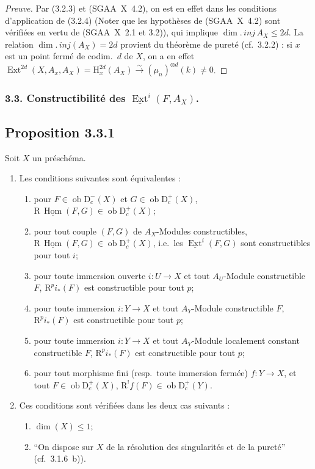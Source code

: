 \documentclass[11pt]{article}
\renewcommand{\H}{\mathrm{H}}
\DeclareMathOperator{\Hom}{Hom}
\DeclareMathOperator{\Ext}{Ext}
\newcommand{\R}{\mathrm{R}}
\newcommand{\D}{\mathrm{D}}
\newcommand{\ob}{\operatorname{ob}}
\providecommand{\Hom}{\operatorname{Hom}}
\providecommand{\ob}{\operatorname{ob}}
\providecommand{\R}{\mathrm R}
\providecommand{\Hom}{\operatorname{Hom}}
\begin{document}
\begin{proof}[Preuve]
Par (3.2.3) et (SGAA~X~4.2), on est en effet dans les conditions d'application de (3.2.4) (Noter que les hypothèses de (SGAA~X~4.2) sont vérifiées en vertu de (SGAA~X~2.1 et 3.2)), qui implique $\dim.\,inj\, A_X \leqslant 2d$. La relation $\dim.\,inj(A_X) = 2d$ provient du théorème de pureté (cf.~3.2.2) : si $x$ est un point fermé de codim.~$d$ de $X$, on a en effet $\Ext^{2d}(X, A_x, A_X) = \H^{2d}_x(A_X) \xrightarrow{\sim} (\mu_n)^{\otimes d}(k) \neq 0$.
\end{proof}

\subsubsection{3.3. Constructibilité des $\underline{\Ext}^i(F, A_X)$.}

\subsection*{Proposition 3.3.1}
Soit $X$ un préschéma.
\begin{enumerate}
\item[a)] Les conditions suivantes sont équivalentes :
\begin{enumerate}
\item[(i)] pour $F \in \ob \D_c^{-}(X)$ et $G \in \ob \D_c^{+}(X)$, $\R\,\underline{\Hom}(F,G) \in \ob \D_c^{+}(X)$;
\item[(i~bis)] pour tout couple $(F,G)$ de $A_X$-Modules constructibles, $\R\,\underline{\Hom}(F,G) \in \ob \D_c^{+}(X)$, i.e.~les $\underline{\Ext}^i(F,G)$ sont constructibles pour tout $i$;
\item[(ii)] pour toute immersion ouverte $i : U \to X$ et tout $A_U$-Module constructible $F$, $\R^p i_{*}(F)$ est constructible pour tout $p$;
\item[(ii~bis)] pour toute immersion $i : Y \to X$ et tout $A_Y$-Module constructible $F$, $\R^p i_{*}(F)$ est constructible pour tout $p$;
\item[(ii~ter)] pour toute immersion $i : Y \to X$ et tout $A_Y$-Module localement constant constructible $F$, $\R^p i_{*}(F)$ est constructible pour tout $p$;
\item[(iii)] pour tout morphisme fini (resp.~toute immersion fermée) $f : Y \to X$, et tout $F \in \ob \D_c^{+}(X)$, $\R^{!}f(F) \in \ob \D_c^{+}(Y)$.
\end{enumerate}
\item[b)] Ces conditions sont vérifiées dans les deux cas suivants :
\begin{enumerate}
\item[(i)] $\dim(X) \leqslant 1$;
\item[(ii)] ``On dispose sur $X$ de la résolution des singularités et de la pureté'' (cf.~3.1.6~b)).
\end{enumerate}
\end{enumerate}
\end{document}
